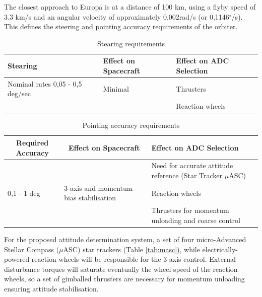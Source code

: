 The closest approach to Europa is at a distance of 100 km, using a flyby speed of 3.3 km/s and an angular velocity of approximately 0,002rad/s (or 0,1146$^{\circ}$/s). This defines the steering and pointing accuracy requirements of the orbiter. 
\begin{table}[htb!]
  \centering
    \begin{tabular}{|p{}|p{}|p{}|}
    \hline
    \textbf{Stearing} & \textbf{Effect on Spacecraft} & \textbf{Effect on ADC Selection} \bigstrut\\
    \hline
    Nominal rates 0,05 - 0,5 deg/sec & Minimal & Thrusters \bigstrut\\
\cline{3-3}          &       & Reaction wheels \bigstrut\\
    \hline
    \end{tabular}%
    \caption{Stearing requirements \cite {spacemissionanalysis}}
  \label{tab:stearing_req}%
\end{table}%

\begin{table}[htb!]
  \centering
    \begin{tabular}{|p{}|p{}|p{}|}
    \hline
    \multicolumn{1}{|c|}{\textbf{Required Accuracy}} & \multicolumn{1}{c|}{\textbf{Effect on Spacecraft}} & \textbf{Effect on ADC Selection} \bigstrut\\
    \hline
          &       & Need for accurate attitude reference (Star Tracker $\mu$ASC) \bigstrut\\
\cline{3-3}    0,1 - 1 deg & 3-axis and momentum - bias stabilisation & Reaction wheels \bigstrut\\
\cline{3-3}          &       & Thrusters for momentum unloading and coarse control \bigstrut\\
    \hline
    \end{tabular}%
    \caption{Pointing accuracy requirements \cite {spacemissionanalysis}}
  \label{tab:point_acc_req}%
\end{table}%
For the proposed attitude determination system, a set of four micro-Advanced Stellar Compass ($\mu$ASC) star trackers (Table \ref{tab:masc}), while electrically-powered reaction wheels will be responsible for the 3-axis control. External disturbance torques will saturate eventually the wheel speed of the reaction wheels, so a set of gimballed thrusters are necessary for momentum unloading ensuring attitude stabilisation.


